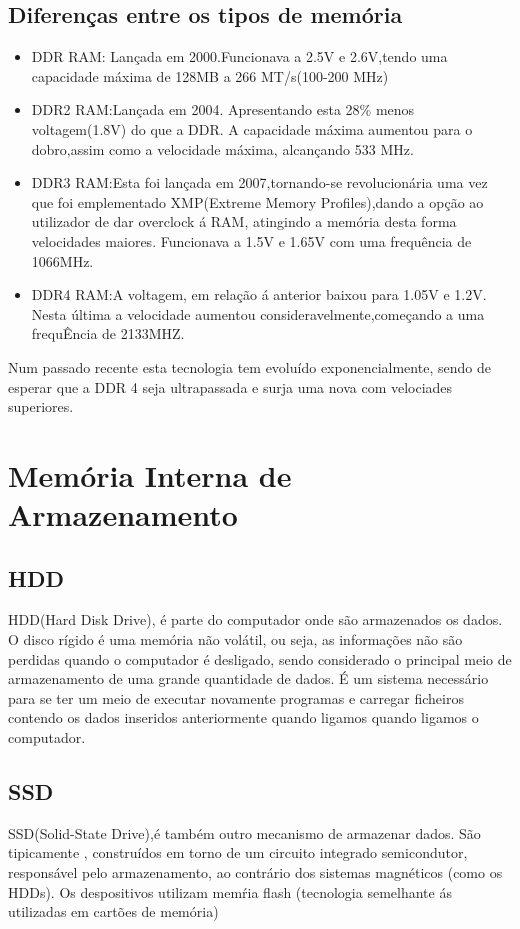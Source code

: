 \section{Diferenças entre os tipos de memória}
\begin{itemize}
\item DDR RAM: Lançada em 2000.Funcionava a 2.5V e 2.6V,tendo uma capacidade máxima de 128MB a 266 MT/s(100-200 MHz)
\item DDR2 RAM:Lançada em 2004. Apresentando esta 28\% menos voltagem(1.8V) do que a DDR. A capacidade máxima aumentou para o dobro,assim como a velocidade máxima, alcançando 533 MHz.   
\item DDR3 RAM:Esta foi lançada em 2007,tornando-se revolucionária uma vez que foi emplementado XMP(Extreme Memory Profiles),dando a opção ao utilizador de dar overclock á RAM, atingindo a memória desta forma velocidades maiores. Funcionava a 1.5V e 1.65V com uma frequência de 1066MHz.
\item DDR4 RAM:A voltagem, em relação á anterior baixou para 1.05V e 1.2V. Nesta última a velocidade aumentou consideravelmente,começando a uma frequÊncia de 2133MHZ.
\end{itemize}
Num passado recente esta tecnologia tem evoluído exponencialmente, sendo de esperar que a DDR 4 seja ultrapassada e surja uma nova com velociades superiores.

\chapter{Memória Interna de Armazenamento}
\label{chap.armazenamento}
\section{HDD}
  HDD(Hard Disk Drive), é parte do computador onde são armazenados os dados. O disco rígido é uma memória não volátil, ou seja, as informações não são perdidas quando o computador é desligado, sendo considerado o principal meio de armazenamento de uma grande quantidade de dados. É um sistema necessário para se ter um meio de executar novamente programas e carregar ficheiros contendo os dados inseridos anteriormente quando ligamos quando ligamos o computador.\\
\section{SSD}
  SSD(Solid-State Drive),é também outro mecanismo de armazenar dados. São tipicamente , construídos em torno de um circuito integrado semicondutor, responsável pelo armazenamento, ao contrário dos sistemas magnéticos (como os HDDs). Os despositivos utilizam memŕia flash (tecnologia semelhante ás utilizadas em cartões de memória)
